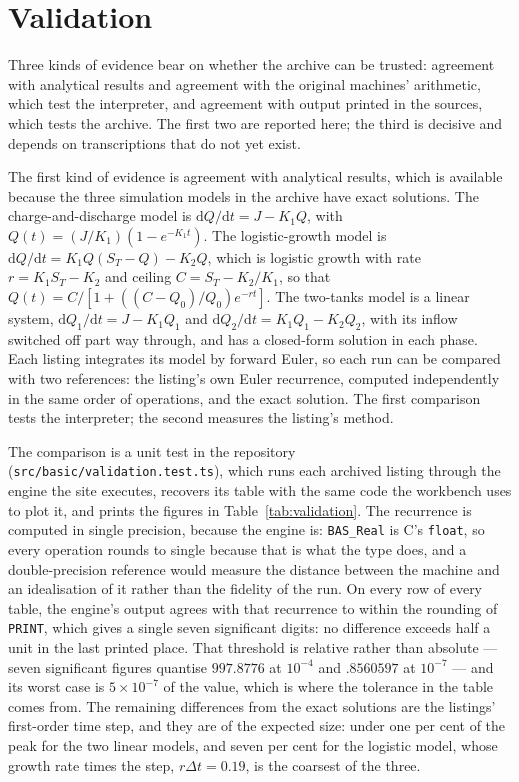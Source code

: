 \section{Validation}
\label{sec:validation}

Three kinds of evidence bear on whether the archive can be trusted: agreement with analytical results and agreement with the original machines' arithmetic, which test the interpreter, and agreement with output printed in the sources, which tests the archive. The first two are reported here; the third is decisive and depends on transcriptions that do not yet exist.

The first kind of evidence is agreement with analytical results, which is available because the three simulation models in the archive have exact solutions. The charge-and-discharge model is $\mathrm{d}Q/\mathrm{d}t = J - K_1Q$, with $Q(t) = (J/K_1)(1-e^{-K_1t})$. The logistic-growth model is $\mathrm{d}Q/\mathrm{d}t = K_1Q(S_T - Q) - K_2Q$, which is logistic growth with rate $r = K_1S_T - K_2$ and ceiling $C = S_T - K_2/K_1$, so that $Q(t) = C/[1 + ((C-Q_0)/Q_0)e^{-rt}]$. The two-tanks model is a linear system, $\mathrm{d}Q_1/\mathrm{d}t = J - K_1Q_1$ and $\mathrm{d}Q_2/\mathrm{d}t = K_1Q_1 - K_2Q_2$, with its inflow switched off part way through, and has a closed-form solution in each phase. Each listing integrates its model by forward Euler, so each run can be compared with two references: the listing's own Euler recurrence, computed independently in the same order of operations, and the exact solution. The first comparison tests the interpreter; the second measures the listing's method.

The comparison is a unit test in the repository (\texttt{src/basic/validation.test.ts}), which runs each archived listing through the engine the site executes, recovers its table with the same code the workbench uses to plot it, and prints the figures in Table~\ref{tab:validation}. The recurrence is computed in single precision, because the engine is: \texttt{BAS\_Real} is C's \texttt{float}, so every operation rounds to single because that is what the type does, and a double-precision reference would measure the distance between the machine and an idealisation of it rather than the fidelity of the run. On every row of every table, the engine's output agrees with that recurrence to within the rounding of \texttt{PRINT}, which gives a single seven significant digits: no difference exceeds half a unit in the last printed place. That threshold is relative rather than absolute --- seven significant figures quantise $997.8776$ at $10^{-4}$ and $.8560597$ at $10^{-7}$ --- and its worst case is $5\times10^{-7}$ of the value, which is where the tolerance in the table comes from. The remaining differences from the exact solutions are the listings' first-order time step, and they are of the expected size: under one per cent of the peak for the two linear models, and seven per cent for the logistic model, whose growth rate times the step, $r\Delta t = 0.19$, is the coarsest of the three.

